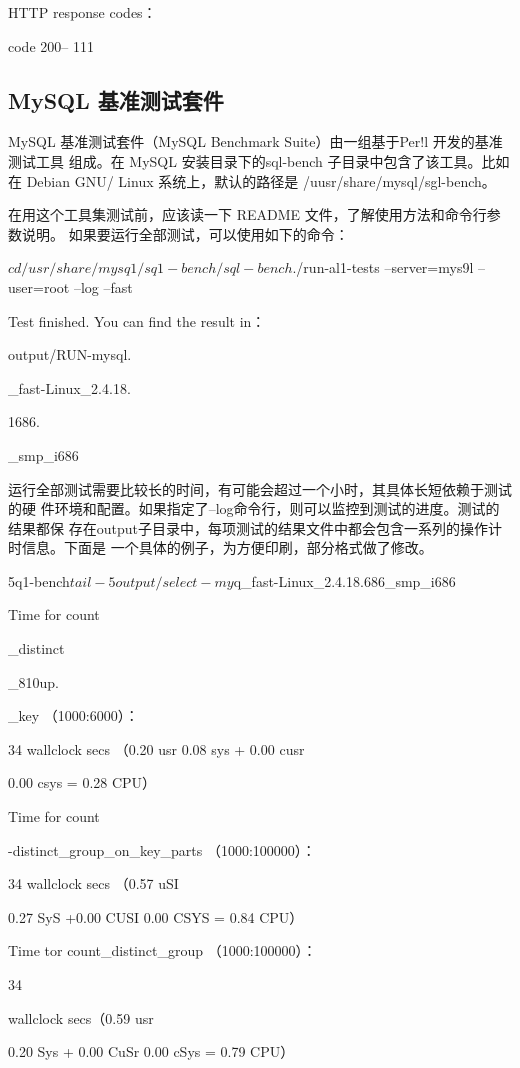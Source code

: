 HTTP response codes：

code 200-- 111

\subsection{MySQL 基准测试套件}
MySQL 基准测试套件（MySQL Benchmark Suite）由一组基于Per!l 开发的基准测试工具
组成。在 MySQL 安装目录下的sql-bench 子目录中包含了该工具。比如在 Debian GNU/
Linux 系统上，默认的路径是 /uusr/share/mysql/sgl-bench。

在用这个工具集测试前，应该读一下 README 文件，了解使用方法和命令行参数说明。
如果要运行全部测试，可以使用如下的命令：

$ cd /usr/share/mysq1/sq1-bench/

sql-bench$./run-al1-tests --server=mys9l --user=root --log --fast

Test finished. You can find the result in：

output/RUN-mysql.

\_fast-Linux\_2.4.18.

1686.

\_smp\_i686

运行全部测试需要比较长的时间，有可能会超过一个小时，其具体长短依赖于测试的硬
件环境和配置。如果指定了--log命令行，则可以监控到测试的进度。测试的结果都保
存在output子目录中，每项测试的结果文件中都会包含一系列的操作计时信息。下面是
一个具体的例子，为方便印刷，部分格式做了修改。

5q1-bench$ tail -5 output/select-my$q\_fast-Linux\_2.4.18.686\_smp\_i686

Time for count

\_distinct

\_810up.

\_key （1000:6000）：

34 wallclock secs （0.20 usr 0.08 sys + 0.00 cusr

0.00 csys = 0.28 CPU）

Time for count

-distinct\_group\_on\_key\_parts （1000:100000）：

34 wallclock secs （0.57 uSI

0.27 SyS +0.00 CUSI 0.00 CSYS = 0.84 CPU）

Time tor count\_distinct\_group （1000:100000）：

34

wallclock secs（0.59 usr

0.20 Sys + 0.00 CuSr 0.00 cSys = 0.79 CPU）

